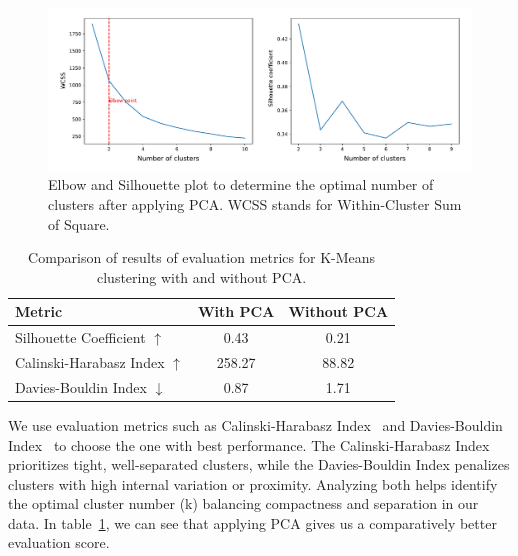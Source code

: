 \documentclass[a4paper,fleqn]{cas-sc}
\begin{document}
\begin{figure}[htb]
  \centering
  \includegraphics[width = \textwidth]{figs/elbow+silhouette_plot_PCA.pdf}
  \caption{Elbow and Silhouette plot to determine the optimal number of clusters after applying PCA. WCSS stands for Within-Cluster Sum of Square.}
  \label{fig:elbow+silhouette_PCA}
\end{figure}

\begin{table}[htb]
\caption{Comparison of results of evaluation metrics for K-Means clustering with and without PCA.}
\label{tab:K-Means_eval}
\begin{tabular*}{\linewidth}{@{\extracolsep{\fill}}lcc@{}}
\toprule
Metric  & \multicolumn{1}{l}{With PCA} & \multicolumn{1}{l}{Without PCA} \\ 
\midrule
Silhouette Coefficient $\uparrow$  & 0.43      & 0.21  \\
Calinski-Harabasz Index $\uparrow$ & 258.27    & 88.82 \\
Davies-Bouldin Index $\downarrow$    & 0.87      & 1.71  \\ 
\bottomrule
\end{tabular*}
\end{table}

We use evaluation metrics such as Calinski-Harabasz Index~\cite{harabasz1974dendrite} and Davies-Bouldin Index~\cite{davies1979cluster} to choose the one with best performance. The Calinski-Harabasz Index prioritizes tight, well-separated clusters, while the Davies-Bouldin Index penalizes clusters with high internal variation or proximity. Analyzing both helps identify the optimal cluster number (k) balancing compactness and separation in our data. In table~\ref{tab:K-Means_eval}, we can see that applying PCA gives us a comparatively better evaluation score. 

\end{document}
